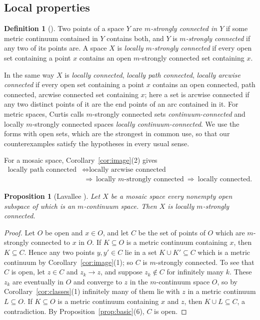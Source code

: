 \documentclass[11pt]{amsart}
\newtheorem{proposition}[theorem]{Proposition}
\theoremstyle{definition}
\newtheorem{definition}[theorem]{Definition}
\theoremstyle{remark}
\numberwithin{equation}{section}
\begin{document}
\subsection{Local properties}
\begin{definition}[{\cite[Definitions~4.1 and 5.1]{lavallee64}}]\label{def:local}
Two points of a space $Y$ are \emph{$m$-strongly connected in $Y$} if some metric continuum contained in $Y$ contains both, and $Y$ is \emph{$m$-strongly connected} if any two of its points are. A space $X$ is \emph{locally $m$-strongly connected} if every open set containing a point $x$ contains an open $m$-strongly connected set containing $x$.
\end{definition}
In the same way $X$ is \emph{locally connected}, \emph{locally path connected}, \emph{locally arcwise connected} if every open set containing a point $x$ contains an open connected, path connected, arcwise connected set containing $x$; here a set is arcwise connected if any two distinct points of it are the end points of an arc contained in it. For metric spaces, Curtis \cite{curtis80} calls $m$-strongly connected sets \emph{continuum-connected} and locally $m$-strongly connected spaces \emph{locally continuum-connected}. We use the forms with open sets, which are the strongest in common use, so that our counterexamples satisfy the hypotheses in every usual sense.

For a mosaic space, Corollary~\ref{cor:image}(2) gives
\begin{equation}\label{eq:localimpl}
\begin{aligned}
\text{locally path connected}&\iff\text{locally arcwise connected}\\
&\ \Longrightarrow\ \text{locally $m$-strongly connected}\ \Longrightarrow\ \text{locally connected}.
\end{aligned}
\end{equation}

\begin{proposition}[Lavallee {\cite[Theorem~5.2]{lavallee64}}]\label{prop:lav52}
Let $X$ be a mosaic space every nonempty open subspace of which is an $m$-continuum space. Then $X$ is locally $m$-strongly connected.
\end{proposition}
\begin{proof}
Let $O$ be open and $x\in O$, and let $C$ be the set of points of $O$ which are $m$-strongly connected to $x$ in $O$. If $K\subseteq O$ is a metric continuum containing $x$, then $K\subseteq C$. Hence any two points $y,y'\in C$ lie in a set $K\cup K'\subseteq C$ which is a metric continuum by Corollary~\ref{cor:image}(1); so $C$ is $m$-strongly connected. To see that $C$ is open, let $z\in C$ and $z_k\to z$, and suppose $z_k\notin C$ for infinitely many $k$. These $z_k$ are eventually in $O$ and converge to $z$ in the $m$-continuum space $O$, so by Corollary~\ref{cor:classes}(1) infinitely many of them lie with $z$ in a metric continuum $L\subseteq O$. If $K\subseteq O$ is a metric continuum containing $x$ and $z$, then $K\cup L\subseteq C$, a contradiction. By Proposition~\ref{prop:basic}(6), $C$ is open.
\end{proof}
\end{document}
